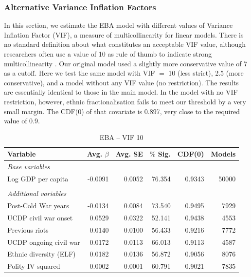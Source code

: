 \subsubsection{Alternative Variance Inflation Factors}

In this section, we estimate the EBA model with different values of Variance Inflation Factor (VIF), a measure of multicollinearity for linear models. There is no standard definition about what constitutes an acceptable VIF value, although researchers often use a value of 10 as rule of thumb to indicate strong multicollinearity \citep[674]{o2007caution}. Our original model used a slightly more conservative value of 7 as a cutoff. Here we test the same model with VIF $=$ 10 (less strict), 2.5 (more conservative), and a model without any VIF value (no restriction). The results are essentially identical to those in the main model. In the model with no VIF restriction, however, ethnic fractionalisation fails to meet our threshold by a very small margin. The CDF(0) of that covariate is 0.897, very close to the required value of 0.9. 

\vspace{1cm}

\begin{table}[H]
\centering
\begin{tabular}{lrrrrr}
\hline
\textbf{Variable} & \textbf{Avg. $\beta$} & \textbf{Avg. SE} & \textbf{$\%$ Sig.} & \textbf{CDF(0)} & \textbf{Models} \\ \hline
\textit{Base variables} &  &  &  &  &  \\
Log GDP per capita & -0.0091 & 0.0052 & 76.354 & 0.9343 & 50000 \\
 &  &  &  &  &  \\
\textit{Additional variables} &  &  &  &  &  \\
Post-Cold War years & -0.0134 & 0.0084 & 73.540 & 0.9495 & 7929 \\
UCDP civil war onset & 0.0529 & 0.0322 & 52.141 & 0.9438 & 4553 \\
Previous riots & 0.0140 & 0.0100 & 56.433 & 0.9216 & 7772 \\
UCDP ongoing civil war & 0.0172 & 0.0113 & 66.013 & 0.9113 & 4587 \\
Ethnic diversity (ELF) & 0.0182 & 0.0136 & 56.872 & 0.9056 & 8076 \\
Polity IV squared & -0.0002 & 0.0001 & 60.791 & 0.9021 & 7835 \\ \hline
\end{tabular}
\caption{EBA -- VIF 10}
\label{tab:mk-high-vif}
\end{table}


